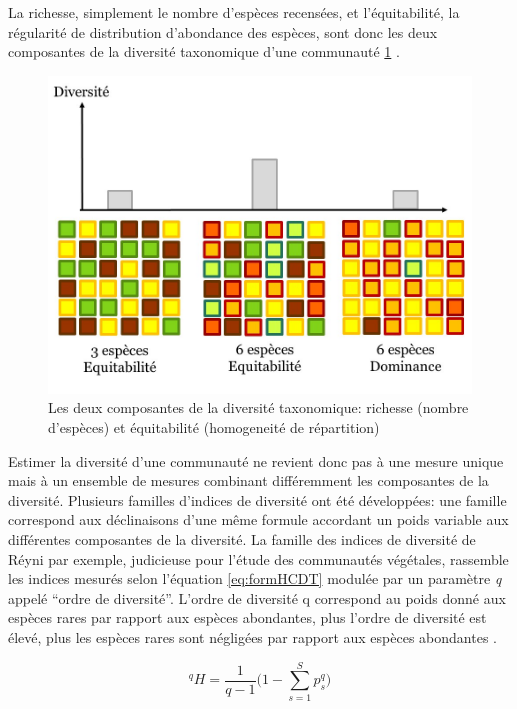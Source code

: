 \documentclass[
  11pt,
  french,
  A4paper,
  extrafontsizes,onecolumn,openright
  ]{memoir}
\begin{document}
La richesse, simplement le nombre d'espèces recensées, et
l'équitabilité, la régularité de distribution d'abondance des espèces,
sont donc les deux composantes de la diversité taxonomique d'une
communauté \ref{fig:RichEqu} \autocites{Whittaker1965}{Magurran2004}.

\begin{figure}

{\centering \includegraphics[width=0.6\linewidth]{ExternalFig/Fig_RichnessEquitability} 

}

\caption{Les deux composantes de la diversité taxonomique: richesse (nombre d'espèces) et équitabilité (homogeneité de répartition)}\label{fig:RichEqu}
\end{figure}

Estimer la diversité d'une communauté ne revient donc pas à une mesure
unique mais à un ensemble de mesures combinant différemment les
composantes de la diversité. Plusieurs familles d'indices de diversité
ont été développées: une famille correspond aux déclinaisons d'une même
formule accordant un poids variable aux différentes composantes de la
diversité. La famille des indices de diversité de Réyni par exemple,
judicieuse pour l'étude des communautés végétales, rassemble les indices
mesurés selon l'équation \eqref{eq:formHCDT} modulée par un paramètre
\emph{q} appelé ``ordre de diversité''. L'ordre de diversité q
correspond au poids donné aux espèces rares par rapport aux espèces
abondantes, plus l'ordre de diversité est élevé, plus les espèces rares
sont négligées par rapport aux espèces abondantes \autocite{Mendes2008}.

\begin{equation}
{^{q}H=\frac{1}{q-1}\Bigg(1-\displaystyle\sum_{s=1}^{S}p^q_s\Bigg) }
\label{eq:formHCDT}
\end{equation}
\end{document}
